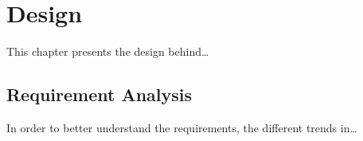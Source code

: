 \chapter{Design}
\label{chap:design}

This chapter presents the design behind\dots

\section{Requirement Analysis}
\label{sec:requirements}

In order to better understand the requirements, the different trends in\dots
\blindtext